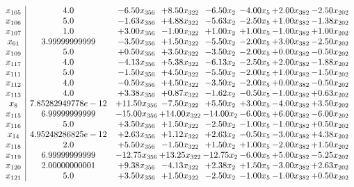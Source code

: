 \documentclass[8pt]{article}
\begin{document}
\[\begin{array}{c| c c@{\hskip 2pt} c@{\hskip 2pt} c@{\hskip 2pt} c@{\hskip 2pt} c@{\hskip 2pt} c@{\hskip 2pt} }
 x_{105}   &  4.0 & -6.50 x_{356} & +  8.50 x_{322} & -6.50 x_{2} & -4.00 x_{5} & +  2.00 x_{382} & -2.50 x_{202}\\
 x_{106}   &  5.0 & -1.63 x_{356} & +  4.88 x_{322} & -5.63 x_{2} & -2.50 x_{5} & +  1.00 x_{382} & -1.38 x_{202}\\
 x_{107}   &  1.0 & +  3.00 x_{356} & -1.00 x_{322} & +  1.00 x_{2} & +  1.00 x_{5} & -1.00 x_{382} & +  1.00 x_{202}\\
 x_{61}   &  3.99999999999 & -3.50 x_{356} & +  1.50 x_{322} & -5.50 x_{2} & -2.00 x_{5} & +  3.00 x_{382} & -2.50 x_{202}\\
 x_{109}   &  5.0 & +  0.50 x_{356} & +  3.50 x_{322} & -3.50 x_{2} & -2.00 x_{5} & +  0.00 x_{382} & -0.50 x_{202}\\
 x_{117}   &  4.0 & -4.13 x_{356} & +  5.38 x_{322} & -6.13 x_{2} & -2.50 x_{5} & +  2.00 x_{382} & -1.88 x_{202}\\
 x_{111}   &  5.0 & -1.50 x_{356} & +  4.50 x_{322} & -5.50 x_{2} & -2.00 x_{5} & +  1.00 x_{382} & -1.50 x_{202}\\
 x_{112}   &  4.0 & -0.50 x_{356} & +  4.50 x_{322} & -3.50 x_{2} & -2.00 x_{5} & +  0.00 x_{382} & -0.50 x_{202}\\
 x_{113}   &  4.0 & +  3.38 x_{356} & +  0.87 x_{322} & -1.62 x_{2} & -0.50 x_{5} & -1.00 x_{382} & +  0.63 x_{202}\\
 x_{8}   &  7.85282949778e-12 & + 11.50 x_{356} & -7.50 x_{322} & +  5.50 x_{2} & +  3.00 x_{5} & -4.00 x_{382} & +  3.50 x_{202}\\
 x_{115}   &  6.99999999999 & -15.00 x_{356} & + 14.00 x_{322} & -14.00 x_{2} & -6.00 x_{5} & +  6.00 x_{382} & -6.00 x_{202}\\
 x_{116}   &  5.0 & +  3.50 x_{356} & +  1.50 x_{322} & -2.50 x_{2} & -1.00 x_{5} & -1.00 x_{382} & +  0.50 x_{202}\\
 x_{14}   &  4.95248286825e-12 & +  2.63 x_{356} & +  1.12 x_{322} & +  2.63 x_{2} & -0.50 x_{5} & -3.00 x_{382} & +  4.38 x_{202}\\
 x_{118}   &  2.0 & +  5.50 x_{356} & -1.50 x_{322} & +  1.50 x_{2} & +  1.00 x_{5} & -2.00 x_{382} & +  1.50 x_{202}\\
 x_{119}   &  6.99999999999 & -12.75 x_{356} & + 13.25 x_{322} & -12.75 x_{2} & -6.00 x_{5} & +  5.00 x_{382} & -5.25 x_{202}\\
 x_{120}   &  2.00000000001 & +  9.38 x_{356} & -4.13 x_{322} & +  2.38 x_{2} & +  1.50 x_{5} & -3.00 x_{382} & +  2.63 x_{202}\\
 x_{121}   &  5.0 & +  3.50 x_{356} & +  1.50 x_{322} & -2.50 x_{2} & -1.00 x_{5} & -1.00 x_{382} & +  0.50 x_{202}\\

\end{array}\]
\end{document}

